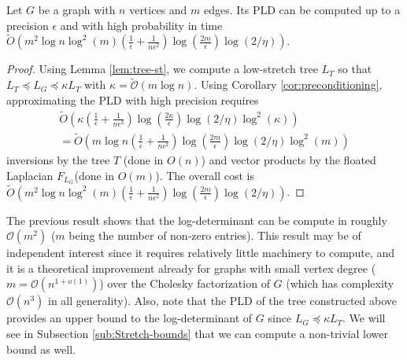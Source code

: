 \begin{theorem} \label{thm:PLD-tree}Let $G$ be a graph with $n$
vertices and $m$ edges. Its PLD can be computed up to a precision
$\epsilon$ and with high probability in time $\tilde{O}\left(m^{2}\log n\log^{2}\left(m\right)\left(\frac{1}{\epsilon}+\frac{1}{n\epsilon^{2}}\right)\log\left(\frac{2m}{\epsilon}\right)\log\left(2/\eta\right)\right)$.\end{theorem}

\begin{proof} Using Lemma \eqref{lem:tree-st}, we compute a low-stretch
tree $L_{T}$ so that $L_{T}\preceq L_{G}\preceq\kappa L_{T}$ with
$\kappa=\tilde{\mathcal{O}}\left(m\log n\right)$. Using Corollary
\eqref{cor:preconditioning}, approximating the PLD with high precision
requires 
\begin{eqnarray*}
\tilde{O}\left(\kappa\left(\frac{1}{\epsilon}+\frac{1}{n\epsilon^{2}}\right)\log\left(\frac{2\kappa}{\epsilon}\right)\log\left(2/\eta\right)\log^{2}\left(\kappa\right)\right)\\
=\tilde{O}\left(m\log n\left(\frac{1}{\epsilon}+\frac{1}{n\epsilon^{2}}\right)\log\left(\frac{2m}{\epsilon}\right)\log\left(2/\eta\right)\log^{2}\left(m\right)\right)
\end{eqnarray*}
 inversions by the tree $T$ (done in $O\left(n\right)$) and vector
products by the floated Laplacian $F_{L_{G}}$(done in $O\left(m\right)$).
The overall cost is $\tilde{O}\left(m^{2}\log n\log^{2}\left(m\right)\left(\frac{1}{\epsilon}+\frac{1}{n\epsilon^{2}}\right)\log\left(\frac{2m}{\epsilon}\right)\log\left(2/\eta\right)\right)$.
\end{proof}

The previous result shows that the log-determinant can be compute
in roughly $\mathcal{O}\left(m^{2}\right)$ ($m$ being the number
of non-zero entries). This result may be of independent interest since
it requires relatively little machinery to compute, and it is a theoretical
improvement already for graphs with small vertex degree ($m=\mathcal{O}\left(n^{1+o\left(1\right)}\right)$)
over the Cholesky factorization of $G$ (which has complexity $\mathcal{O}\left(n^{3}\right)$
in all generality). Also, note that the PLD of the tree constructed
above provides an upper bound to the log-determinant of $G$ since
$L_{G}\preceq\kappa L_{T}$. We will see in Subsection \ref{sub:Stretch-bounds}
that we can compute a non-trivial lower bound as well. 